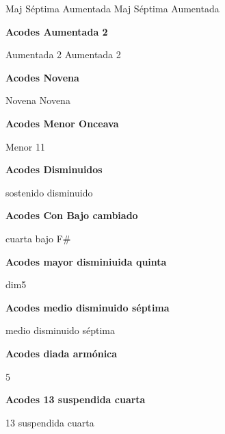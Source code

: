 \small
{} Maj S\'eptima Aumentada
 Maj S\'eptima Aumentada
\normalsize

\vskip 20pt
\textbf{Acodes Aumentada 2}
\vskip 25pt

\small
{} Aumentada 2
 Aumentada 2
\normalsize


\vskip 20pt
\textbf{Acodes Novena}
\vskip 25pt

\small
{} Novena
 Novena
\normalsize

\vskip 20pt
\textbf{Acodes Menor Onceava}
\vskip 25pt

\small
{} Menor 11
\normalsize


\vskip 20pt
\textbf{Acodes Disminuidos}
\vskip 25pt

\small
{} sostenido disminuido
\normalsize


\vskip 20pt
\textbf{Acodes Con Bajo cambiado}
\vskip 25pt

\small
{} \hfill
{} \hfill\null\break
\vskip 20pt
 \hfill
{} \hfill\null\break
\vskip 20pt
 \hfill
{} \hfill\null\break
\vskip 20pt
 \hfill
{} \hfill
{} \hfill\null\break
\vskip 20pt
 \hfill
{} \hfill\null\break
\vskip 20pt
 \hfill\null\break
\vskip 20pt
 cuarta bajo F\# \hfill\null\break
\normalsize

\vskip 20pt
\textbf{Acodes mayor disminiuida quinta}
\vskip 25pt

\small
{} dim5
\normalsize

\vskip 20pt
\textbf{Acodes medio disminuido s\'eptima}
\vskip 25pt

\small
{} medio disminuido s\'eptima
\normalsize

\vskip 20pt
\textbf{Acodes diada arm\'onica}
\vskip 25pt

\small
{} 5
\normalsize

\vskip 20pt
\textbf{Acodes 13 suspendida cuarta}
\vskip 25pt

\small
{} 13 suspendida cuarta
\normalsize

\clearpage
\fi
%
